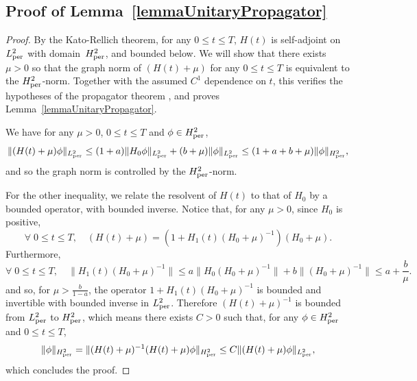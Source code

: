 \documentclass[a4paper,11pt]{article}
\theoremstyle{plain}
\theoremstyle{remark}
\begin{document}
\subsection{Proof of Lemma~\ref{lemmaUnitaryPropagator}}\label{sec:unitaryprop}

\begin{proof}By the Kato-Rellich theorem, for any $0\leq t\leq T$,
  $H(t)$ is self-adjoint on $L^2_{\rm per}$ with domain~$H_{\rm per}^{2}$, and
  bounded below. We will show that there exists $\mu>0$ so that the
  graph norm of $(H(t)+\mu)$ for any $0\leq t \leq T$ is equivalent to
  the $H_{\rm per}^{2}$-norm. Together with the assumed $C^1$ dependence
  on $t$, this verifies the hypotheses of the propagator theorem
  \cite[Theorem X.70]{ReedSimon2}, and proves
  Lemma~\ref{lemmaUnitaryPropagator}.

\medskip

We have for any $\mu>0$, $0\leq t\leq T$ and $\phi \in H_{\rm per}^{2}$,
\[ \|(H(t)+\mu)\phi \|_{L^{2}_{\rm per}} \leq (1+a)\|H_{0} \phi \|_{L^{2}_{\rm per}} + (b+\mu) \|\phi\|_{L^{2}_{\rm per}} \leq (1+a+b+\mu) \|\phi\|_{H_{\rm per}^{2}},\]
and so the graph norm is controlled by the $H_{\rm per}^{2}$-norm.

\medskip

For the other inequality, we relate the resolvent of $H(t)$ to that of $H_{0}$ by a bounded operator, with bounded inverse.
Notice that, for any $\mu>0$, since $H_{0}$ is positive,
\[\forall \; 0\leq t\leq T, \quad (H(t)+\mu) = (1+H_{1}(t)(H_{0}+\mu)^{-1})(H_{0}+\mu).\]
Furthermore,
\[\forall \; 0\leq t\leq T, \quad\|H_{1}(t)(H_{0}+\mu)^{-1}\| \leq
  a\|H_{0}(H_{0}+\mu)^{-1}\| +b\|(H_{0}+\mu)^{-1}\| \leq a
  +\frac{b}{\mu}.\]
and so, for $\mu > \frac{b}{1-a}$, the operator
$1+ H_{1}(t)(H_{0}+\mu)^{-1}$ is bounded and invertible with bounded
inverse in $L^{2}_{\rm per}$. Therefore $(H(t)+\mu)^{-1}$ is bounded
from $L^2_{\rm per}$ to $H_{\rm per}^{2}$, which means there exists $C>0$ such
that, for any $\phi \in H_{\rm per}^{2}$ and $0\leq t\leq T$,
\[  \|\phi\|_{H_{\rm per}^{2}} = \|(H(t)+\mu)^{-1}(H(t)+\mu)\phi\|_{H_{\rm per}^{2}} \leq C\|(H(t)+\mu)\phi\|_{L^{2}_{\rm per}}, \]
which concludes the proof.
\end{proof}




\end{document}
